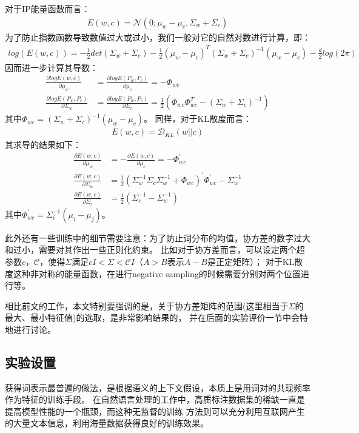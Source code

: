 \documentclass[a4paper,13pt]{article}
\begin{document}
\begin{spacing}{1.5}
对于IP能量函数而言：
\begin{align*}
E(w,c)=\mathcal{N}(0;\mu_w-\mu_c,\Sigma_w+\Sigma_c)
\end{align*}
为了防止指数函数导致数值过大或过小，我们一般对它的自然对数进行计算，即：
\begin{align*}
log(E(w,c)) = -\frac{1}{2}det(\Sigma_w+\Sigma_c) - \frac{1}{2}(\mu_w-\mu_c)^{T}(\Sigma_w+\Sigma_c)^{-1}(\mu_w-\mu_c) - \frac{d}{2}log(2\pi)
\end{align*}
因而进一步计算其导数：
\begin{align*}
\frac{\partial{}logE(w,c)}{\partial{}\mu_w} &=\frac{\partial{}logE(P_w,P_c)}{\partial{}\mu_c}  =-\Phi_{wc}  \\
\frac{\partial{logE(P_w,P_c)}}{\partial{\Sigma_w}}& =\frac{\partial{logE(P_w,P_c)}}{\partial{\Sigma_c}} = \frac{1}{2}(\Phi_{wc} \Phi_{wc}^{T}-(\Sigma_w+\Sigma_c)^{-1})
\end{align*}
其中$\Phi_{wc} = (\Sigma_w+\Sigma_c)^{-1}(\mu_w-\mu_c)$。
同样，对于KL散度而言：
\begin{align*}
E(w,c)=\mathcal{D}_{KL}(w||c)
\end{align*}
其求导的结果如下：
\begin{align*}
\frac{\partial{}E(w,c)}{\partial{}\mu_w} &= - \frac{\partial{}E(w,c)}{\partial{}\mu_c} =  -\Phi_{wc}^{'} \\
\frac{\partial{}E(w,c)}{\partial{}\Sigma_w} &= \frac{1}{2}(\Sigma_w^{-1} \Sigma_{c} \Sigma_{w}^{-1} + \Phi_{wc})^{'}\Phi_{wc}^{'} - \Sigma_w^{-1} \\ 
\frac{\partial{}E(w,c)}{\partial{}\Sigma_c} &= \frac{1}{2}(\Sigma_c^{-1} - \Sigma_{w}^{-1})
\end{align*}
其中$\Phi_{wc}^{'}=\Sigma_{i}^{-1}(\mu_i-\mu_j)$。

此外还有一些训练中的细节需要注意：为了防止词分布的均值，协方差的数字过大和过小，需要对其作出一些正则化约束。
比如对于协方差而言，可以设定两个超参数$c$，$\mathcal{C}$，使得$\Sigma$满足$cI<\Sigma<\mathcal{C} I$（$A>B$表示$A-B$是正定矩阵）；
对于KL散度这种非对称的能量函数，在进行negative sampling的时候需要分别对两个位置进行等。

相比前文的工作，本文特别要强调的是，关于协方差矩阵的范围(这里相当于$\Sigma$的最大、最小特征值)的选取，是非常影响结果的，
并在后面的实验评价一节中会特地进行讨论。

\subsection{实验设置}
获得词表示最普遍的做法，是根据语义的上下文假设，本质上是用词对的共现频率作为特征的训练手段。
在自然语言处理的工作中，高质标注数据集的稀缺一直是提高模型性能的一个瓶颈，而这种无监督的训练
方法则可以充分利用互联网产生的大量文本信息，利用海量数据获得良好的训练效果。


\end{spacing}
\end{document}
